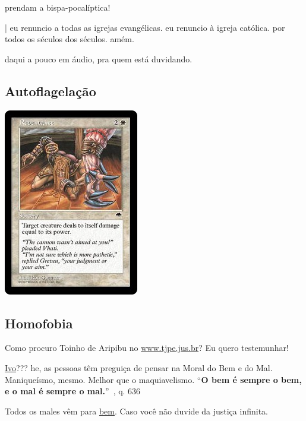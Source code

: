 \documentclass[12pt,a4paper]{article}
\begin{document}
prendam a bispa-pocal\'iptica!

| eu renuncio a todas as igrejas evang\'elicas. eu renuncio \`a igreja
cat\'olica. por todos os s\'eculos dos s\'eculos. am\'em.

daqui a pouco em \'audio, pra quem est\'a duvidando.
		\subsection{Autoflagela\c{c}\~ao}
			\begin{flushright}
			\end{flushright}

			\begin{center}
			\includegraphics{penitencia}
			\end{center}

		\subsection{Homofobia}\label{homofobia}
			\begin{flushright}
			\end{flushright}

Como procuro Toinho de Aripibu no \href{http://www.tjpe.jus.br/processos/consulta1grau/oleBuscaProcessosNumero.asp?nume=2147919958170660&amp;txtCodigoSeguranca=97745&amp;m=7}{www.tjpe.jus.br}? Eu quero testemunhar!

\href{http://www.youtube.com/watch?v=faGIZnxdXzI}{Ivo}??? he, as
pessoas t\^em pregui\c{c}a de pensar na Moral do Bem e do Mal. Manique\'ismo,
mesmo. Melhor que o maquiavelismo.
\textquotedblleft \textbf{O bem \'e sempre o bem, e o mal \'e
sempre o mal.}\textquotedblright\, \cite{le}, q. 636

Todos os males v\^em para \href{http://www.guia.heu.nom.br/o_bem_e_o_mal.htm}{bem}. Caso voc\^e n\~ao duvide da justi\c{c}a infinita.
\end{document}
